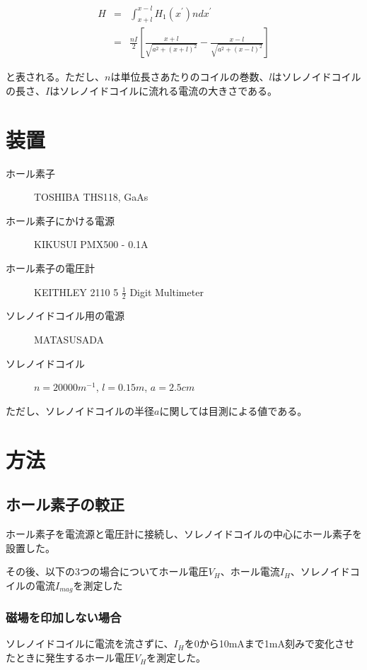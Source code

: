 \documentclass[uplatex,11pt]{jsarticle}
\begin{document}
\begin{eqnarray}
    H & = & \int_{x + l}^{x - l} H_1(x^{\prime}) ndx^{\prime} \nonumber \\
      & = & \frac{nI}{2} \left[ \frac{x + l}{\sqrt{a^2+(x+l)^2}} - \frac{x - l}{\sqrt{a^2+(x-l)^2}} \right] \label{eq_solenoid_theoretical}
\end{eqnarray}

と表される。ただし、$n$は単位長さあたりのコイルの巻数、$l$はソレノイドコイルの長さ、$I$はソレノイドコイルに流れる電流の大きさである。

\section{装置}

\begin{description}
    \item[ホール素子] TOSHIBA THS118, GaAs
    \item[ホール素子にかける電源] KIKUSUI PMX500 - 0.1A
    \item[ホール素子の電圧計] KEITHLEY 2110 5 $\frac{1}{2}$ Digit Multimeter 
    \item[ソレノイドコイル用の電源] MATASUSADA
    \item[ソレノイドコイル] $n = 20000 m^{-1}$, $l = 0.15 m$, $a = 2.5 cm$
\end{description}

ただし、ソレノイドコイルの半径$a$に関しては目測による値である。

\section{方法}

\subsection{ホール素子の較正}

ホール素子を電流源と電圧計に接続し、ソレノイドコイルの中心にホール素子を設置した。

その後、以下の3つの場合についてホール電圧$V_H$、ホール電流$I_H$、ソレノイドコイルの電流$I_{mag}$を測定した

\subsubsection{磁場を印加しない場合}

ソレノイドコイルに電流を流さずに、$I_H$を0から10mAまで1mA刻みで変化させたときに発生するホール電圧$V_H$を測定した。
\end{document}
